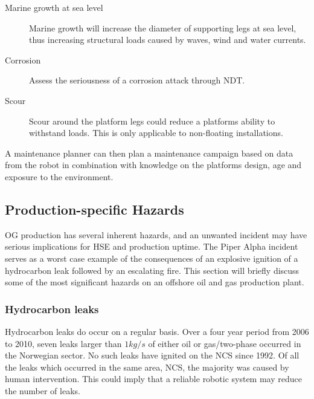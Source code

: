 \begin{description}
\item[Marine growth at sea level] Marine growth will increase the diameter of supporting legs at sea level, thus increasing structural loads caused by waves, wind and water currents. 
\item[Corrosion] Assess the seriousness of a corrosion attack through \ac{NDT}.
\item[Scour] Scour around the platform legs could reduce a platforms ability to withstand loads. This is only applicable to non-floating installations.
\end{description}

A maintenance planner can then plan a maintenance campaign based on data from the robot in combination with knowledge on the platforms design, age and exposure to the environment.

\subsection{Production-specific Hazards}

\ac{OG} production has several inherent hazards, and an unwanted incident may have serious implications for \ac{HSE} and production uptime. The Piper Alpha incident serves as a worst case example of the consequences of an explosive ignition of a hydrocarbon leak followed by an escalating fire. This section will briefly discuss some of the most significant hazards on an offshore oil and gas production plant.




\subsubsection{Hydrocarbon leaks}

Hydrocarbon leaks do occur on a regular basis. Over a four year period from 2006 to 2010, seven leaks larger than $1 kg/s$ of either oil or gas/two-phase occurred in the Norwegian sector. No such leaks have ignited on the \ac{NCS} since 1992. Of all the leaks which occurred in the same area, \ac{NCS}, the majority was caused by human intervention\cite{Vinnem2014}. This could imply that a reliable robotic system may reduce the number of leaks.

